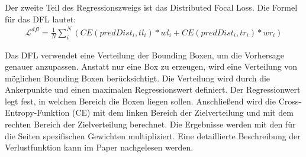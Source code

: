 Der zweite Teil des Regressionszweigs ist das Distributed Focal Loss. Die Formel für das DFL lautet:
\begin{align}
	\mathcal{L}^{dfl}=\frac{1}{N}\sum_{i}^{N}(CE(predDist_i, tl_i)*wl_i+CE(predDist_i, tr_i)*wr_i)
\end{align}

Das DFL verwendet eine Verteilung der Bounding Boxen, um die Vorhersage genauer anzupassen. Anstatt nur eine Box zu erzeugen, wird eine Verteilung von möglichen Bounding Boxen berücksichtigt. Die Verteilung wird durch die Ankerpunkte und einen maximalen Regressionswert definiert. Der Regressionwert legt fest, in welchen Bereich die Boxen liegen sollen. Anschließend wird die Cross-Entropy-Funktion (CE) mit dem linken Bereich der Zielverteilung und mit dem rechten Bereich der Zielverteilung berechnet. Die Ergebnisse werden mit den für die Seiten spezifischen Gewichten multipliziert. Eine detaillierte Beschreibung der Verlustfunktion kann im Paper nachgelesen werden. \cite{dflLoss}

